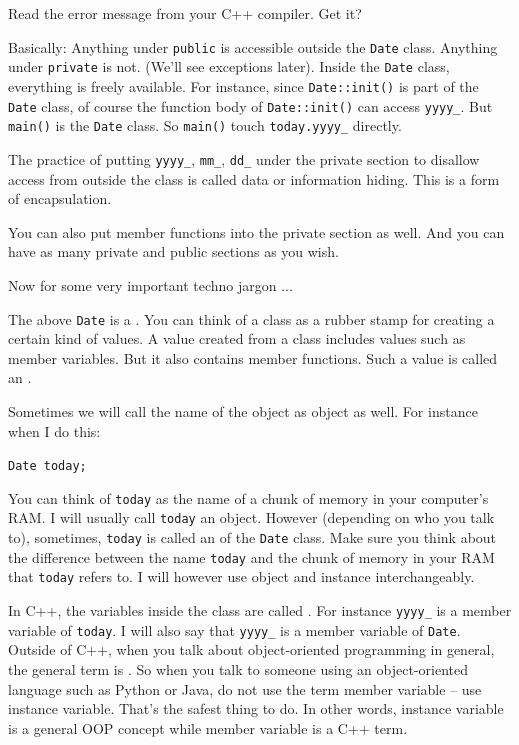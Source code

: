 Read the error message from your C++ compiler. Get it?

Basically: Anything under \texttt{public} is accessible outside the
\texttt{Date} class. Anything under \texttt{private} is not. (We'll see
exceptions later). Inside the \texttt{Date} class, everything is freely
available. For instance, since \texttt{Date::init()} is part of the
\texttt{Date} class, of course the function body of \texttt{Date::init()}
can access \texttt{yyyy\_}. But \texttt{main()} is  the
\texttt{Date} class. So \texttt{main()}  touch
\texttt{today.yyyy\_} directly.

The practice of putting \texttt{yyyy\_}, \texttt{mm\_}, \texttt{dd\_} under
the private section to disallow access from outside the class is called
data or information hiding. This is a form of encapsulation.

You can also put member functions into the private section as well. And
you can have as many private and public sections as you wish.


Now for some very important techno jargon ...

The above \texttt{Date} is a . You can think of a class as a rubber stamp for creating a certain kind of values. A value created from a class includes values such as member variables. But it also contains member functions. Such a value is called an .

Sometimes we will call the name of the object as object as well. For instance when I do this:

\texttt{Date today;}

You can think of \texttt{today} as the name of a chunk of memory in your computer's RAM. I will usually call \texttt{today} an object. However (depending on who you talk to), sometimes, \texttt{today} is called an  of the \texttt{Date} class. Make sure you think about the difference between the name \texttt{today} and the chunk of memory in your RAM that \texttt{today} refers to. I will however use object and instance interchangeably.

In C++, the variables inside the class are called . For instance \texttt{yyyy\_} is a member variable of \texttt{today}. I will also say that \texttt{yyyy\_} is a member variable of \texttt{Date}. Outside of C++, when you talk about object-oriented programming in general, the general term is . So when you talk to someone using an object-oriented language such as Python or Java, do not use the term member variable -- use instance variable. That's the safest thing to do. In other words, instance variable is a general OOP concept while member variable is a C++ term.

